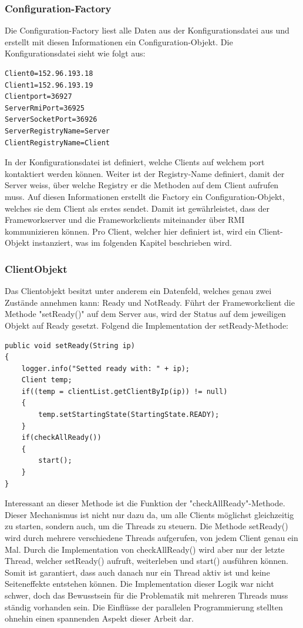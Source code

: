 \subsubsection{Configuration-Factory}
\label{sec:configurationFactory}
Die Configuration-Factory liest alle Daten aus der Konfigurationsdatei aus und erstellt mit diesen Informationen ein Configuration-Objekt. Die Konfigurationsdatei sieht wie folgt aus:
\begin{lstlisting}
Client0=152.96.193.18
Client1=152.96.193.19
Clientport=36927
ServerRmiPort=36925
ServerSocketPort=36926
ServerRegistryName=Server
ClientRegistryName=Client
\end{lstlisting}

In der Konfigurationsdatei ist definiert, welche Clients auf welchem port kontaktiert werden können. Weiter ist der Registry-Name definiert, damit der Server weiss, über welche Registry er die Methoden auf dem Client aufrufen muss. \newline
Auf diesen Informationen erstellt die Factory ein Configuration-Objekt, welches sie dem Client als erstes sendet. Damit ist gewährleistet, dass der Frameworkserver und die Frameworkclients miteinander über RMI kommunizieren können. \newline
Pro Client, welcher hier definiert ist, wird ein Client-Objekt instanziert, was im folgenden Kapitel beschrieben wird.

\subsubsection{ClientObjekt}
\label{sec:ClientObjekt}

Das Clientobjekt besitzt unter anderem ein Datenfeld, welches genau zwei Zustände annehmen kann: Ready und NotReady. Führt der Frameworkclient die Methode "setReady()" auf dem Server aus, wird der Status auf dem jeweiligen Objekt auf Ready gesetzt. Folgend die Implementation der setReady-Methode:
\begin{lstlisting}
public void setReady(String ip) 
{
	logger.info("Setted ready with: " + ip);
	Client temp;
	if((temp = clientList.getClientByIp(ip)) != null)
	{
		temp.setStartingState(StartingState.READY);
	}
	if(checkAllReady())
	{
		start();
	}
}
\end{lstlisting}

Interessant an dieser Methode ist die Funktion der "checkAllReady"-Methode. Dieser Mechanismus ist nicht nur dazu da, um alle Clients möglichst gleichzeitig zu starten, sondern auch, um die Threads zu steuern. Die Methode setReady() wird durch mehrere verschiedene Threads aufgerufen, von jedem Client genau ein Mal. Durch die Implementation von checkAllReady() wird aber nur der letzte Thread, welcher setReady() aufruft, weiterleben und start() ausführen können. Somit ist garantiert, dass auch danach nur ein Thread aktiv ist und keine Seiteneffekte entstehen können.\newline
Die Implementation dieser Logik war nicht schwer, doch das Bewusstsein für die Problematik mit mehreren Threads muss ständig vorhanden sein. Die Einflüsse der parallelen Programmierung stellten ohnehin einen spannenden Aspekt dieser Arbeit dar. 

